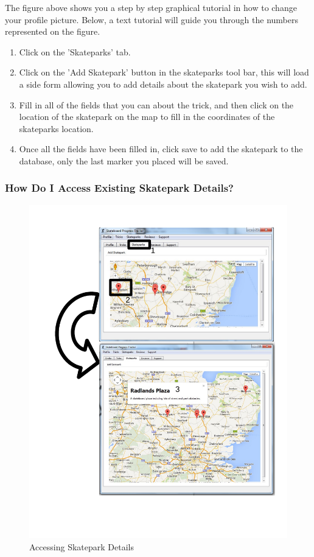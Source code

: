 The figure above shows you a step by step graphical tutorial in how to change your profile picture. Below, a text tutorial will guide you through the numbers represented on the figure.

\begin{enumerate}
\item Click on the 'Skateparks' tab.
\item Click on the 'Add Skatepark' button in the skateparks tool bar, this will load a side form allowing you to add details about the skatepark you wish to add.
\item Fill in all of the fields that you can about the trick, and then click on the location of the skatepark on the map to fill in the coordinates of the skateparks location.
\item Once all the fields have been filled in, click save to add the skatepark to the database, only the last marker you placed will be saved.
\end{enumerate}

\subsubsection{How Do I Access Existing Skatepark Details?}

\begin{figure}[H]
    \includegraphics[width=\textwidth]{./Manual/Images/SkateparkDetails.pdf}
    \caption{Accessing Skatepark Details} \label{fig:Skatepark Details}
\end{figure}

